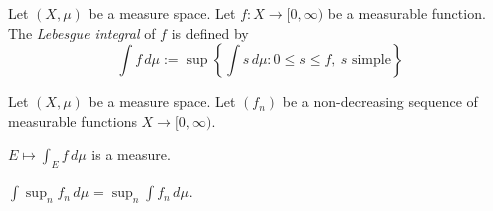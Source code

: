 \documentclass{../../large}
\begin{document}

\begin{prb}
Let $(X,\mu)$ be a measure space.
Let $f:X\to[0,\infty)$ be a measurable function.
The \emph{Lebesgue integral} of $f$ is defined by
\[\int f\,d\mu:=\sup\left\{\int s\,d\mu:0\le s\le f,\ \text{$s$ simple}\right\}\]
\end{prb}

\begin{prb}
Let $(X,\mu)$ be a measure space.
Let $(f_n)$ be a non-decreasing sequence of measurable functions $X\to[0,\infty)$.
\begin{parts}
\item $E\mapsto\int_Ef\,d\mu$ is a measure.
\item $\int\sup_nf_n\,d\mu=\sup_n\int f_n\,d\mu$.
\end{parts}
\end{prb}
\end{document}
